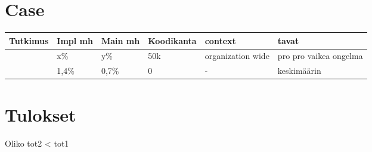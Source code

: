 \documentclass[finnish]{tktltiki2}
\theoremstyle{definition}
\theoremstyle{remark}
\begin{document}
\section{Case}
\begin{center}
    \begin{tabular}{ | l | l | l | l | l | p{4cm} |}
    \hline
    Tutkimus & Impl mh & Main mh & Koodikanta & context & tavat \\ \hline
    	\cite{case} & x\% & y\% & 50k & organization wide & pro pro vaikea ongelma \\ \hline
	\cite{costandbenefit} & 1,4\% & 0,7\% & 0 & - & keskimäärin \\ \hline
    \end{tabular}
\end{center}

\section{Tulokset}
Oliko tot2 < tot1

%
%
% 
%



\end{document}
